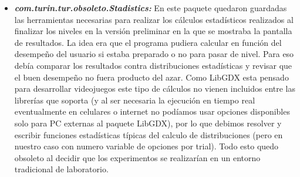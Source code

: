 \documentclass{article}
\begin{document}
\begin{itemize}
        \item \textit{\textbf{com.turin.tur.obsoleto.Stadistics:}} En este paquete quedaron guardadas las herramientas necesarias para realizar los cálculos estadísticos realizados al finalizar los niveles en la versión preliminar en la que se mostraba la pantalla de resultados. La idea era que el programa pudiera calcular en función del desempeño del usuario si estaba preparado o no para pasar de nivel. Para eso debía comparar los resultados contra distribuciones estadísticas y revisar que el buen desempeño no fuera producto del azar. Como LibGDX esta pensado para desarrollar videojuegos este tipo de cálculos no vienen incluidos entre las librerías que soporta (y al ser necesaria la ejecución en tiempo real eventualmente en celulares o internet no podíamos usar opciones disponibles solo para PC externas al paquete LibGDX), por lo que debimos resolver y escribir funciones estadísticas típicas del calculo de distribuciones (pero en nuestro caso con numero variable de opciones por trial). Todo esto quedo obsoleto al decidir que los experimentos se realizarían en un entorno tradicional de laboratorio. 
        

\end{itemize}
\end{document}
